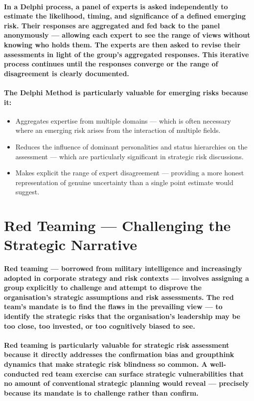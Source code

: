 \paragraph{In a Delphi process, a panel of experts is asked independently to estimate the likelihood, timing, and significance of a defined emerging risk. Their responses are aggregated and fed back to the panel anonymously — allowing each expert to see the range of views without knowing who holds them. The experts are then asked to revise their assessments in light of the group's aggregated responses. This iterative process continues until the responses converge or the range of disagreement is clearly documented.}
\paragraph{The Delphi Method is particularly valuable for emerging risks because it:}
\begin{itemize}
  \item{Aggregates expertise from multiple domains — which is often necessary where an emerging risk arises from the interaction of multiple fields.}
  \item{Reduces the influence of dominant personalities and status hierarchies on the assessment — which are particularly significant in strategic risk discussions.}
  \item{Makes explicit the range of expert disagreement — providing a more honest representation of genuine uncertainty than a single point estimate would suggest.}
\end{itemize}

\section{Red Teaming — Challenging the Strategic Narrative}
\paragraph{\textbf{Red teaming} — borrowed from military intelligence and increasingly adopted in corporate strategy and risk contexts — involves assigning a group explicitly to challenge and attempt to disprove the organisation's strategic assumptions and risk assessments. The red team's mandate is to find the flaws in the prevailing view — to identify the strategic risks that the organisation's leadership may be too close, too invested, or too cognitively biased to see.}
\paragraph{Red teaming is particularly valuable for strategic risk assessment because it directly addresses the confirmation bias and groupthink dynamics that make strategic risk blindness so common. A well-conducted red team exercise can surface strategic vulnerabilities that no amount of conventional strategic planning would reveal — precisely because its mandate is to challenge rather than confirm.}
